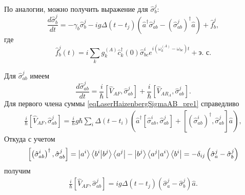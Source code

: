 По аналогии, можно получить выражение для $\hat{\sigma}_b^j$:
\begin{equation}
\frac{d \hat{\sigma}_b^j}{d t} = 
- \gamma_{b} \hat{\sigma}_{b}^{j} -
i g 
\Delta\left(t - t_j\right) 
 \left(
\hat{a}^{\dag}\hat{\sigma}^{j}_{ab} -
\left(\hat{\sigma}^{j}_{ab}\right)^{\dag}\hat{a}
\right) + \hat{f}_{b}^{j},
\label{eqLaserHaizenbergSigmaBJ}
\end{equation}
где
\begin{equation}
\hat{f}_{b}^{j}\left(t\right) = i
\sum_{k}
g_k^{(A)}
\hat{c}_k^{\dag}\left(0\right)\hat{\sigma}^{i}_{bc}  
e^{i\left(\omega_k^{(A)} - \omega_{bc}\right)t} + \mbox{э. с.}
\label{eqLaserHaizenbergFBJ}
\end{equation}

Для $\hat{\sigma}^{j}_{ab}$ имеем
\begin{equation}
\frac{d \hat{\sigma}_{ab}^j}{d t} = 
\frac{i}{\hbar}
\left[\hat{V}_{AF}, \hat{\sigma}_{ab}^j\right] + 
\frac{i}{\hbar}
\left[\hat{V}_{AR_A}, \hat{\sigma}_{ab}^j\right].
\label{eqLaserHaizenbergSigmaAB_pre1}
\end{equation}
Для первого члена суммы \eqref{eqLaserHaizenbergSigmaAB_pre1} справедливо
\begin{eqnarray}
\frac{i}{\hbar}
\left[\hat{V}_{AF}, \hat{\sigma}_{ab}^j\right] = 
 \frac{i}{\hbar} g \hbar
\sum_i
\Delta\left(t - t_i\right) 
 \left(
\hat{a}^{\dag}\left[\hat{\sigma}^{i}_{ab},\hat{\sigma}_{ab}^j\right]  +
\left[\left(\hat{\sigma}^{i}_{ab}\right)^{\dag},\hat{\sigma}_{ab}^j\right]
\hat{a}
\right),
\nonumber
\end{eqnarray}
Откуда с учетом 
\begin{eqnarray}
\left[\left(\hat{\sigma}^{i}_{ab}\right)^{\dag},\hat{\sigma}_{ab}^j\right] = 
\ket{a^i}\bra{b^i}\ket{b^j}\bra{a^j} -
\ket{b^j}\bra{a^j}\ket{a^i}\bra{b^i} = 
- \delta_{ij}\left(\hat{\sigma}^{j}_{a} - \hat{\sigma}^{j}_{b}\right)
\nonumber
\end{eqnarray}
получим
\begin{eqnarray}
\frac{i}{\hbar}
\left[\hat{V}_{AF}, \hat{\sigma}_{ab}^j\right] = 
i g 
\Delta\left(t - t_j\right) 
\left(\hat{\sigma}^{j}_{a} -
\hat{\sigma}^{j}_{b}\right)\hat{a}.
\label{eqLaserHaizenbergSigmaAB_pre1_1}
\end{eqnarray}

